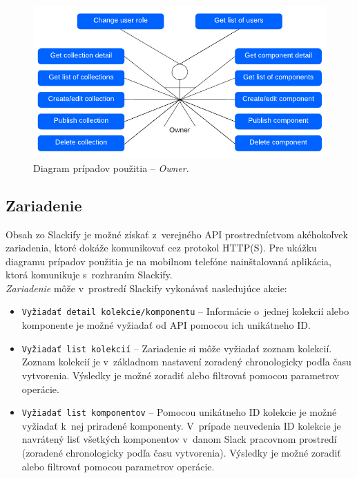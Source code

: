 \begin{figure}[h]
	\centering
	\includegraphics[scale=0.9]{obrazky-figures/owner_use_case}
	\caption{Diagram prípadov použitia -- \emph{Owner}.}
\end{figure}

\subsection{Zariadenie}
Obsah zo Slackify je možné získať z~verejného API prostredníctvom akéhokoľvek zariadenia, ktoré dokáže komunikovať cez protokol HTTP(S). Pre ukážku diagramu prípadov použitia je na mobilnom telefóne nainštalovaná aplikácia, ktorá komunikuje s~rozhraním Slackify. \\

\noindent \emph{Zariadenie} môže v~prostredí Slackify vykonávať nasledujúce akcie:

\begin{itemize}
	\item \texttt{Vyžiadať detail kolekcie/komponentu} -- Informácie o~jednej kolekcií alebo komponente je možné vyžiadať od API pomocou ich unikátneho ID.
	\item \texttt{Vyžiadať list kolekcií} -- Zariadenie si môže vyžiadať zoznam kolekcií. Zoznam kolekcií je v~základnom nastavení zoradený chronologicky podľa času vytvorenia. Výsledky je možné zoradiť alebo filtrovať pomocou parametrov operácie.
	\item \texttt{Vyžiadať list komponentov} -- Pomocou unikátneho ID kolekcie je možné vyžiadať k~nej priradené komponenty. V~prípade neuvedenia ID kolekcie je navrátený lisť všetkých komponentov v~danom Slack pracovnom prostredí (zoradené chronologicky podľa času vytvorenia). Výsledky je možné zoradiť alebo filtrovať pomocou parametrov operácie.
\end{itemize}

